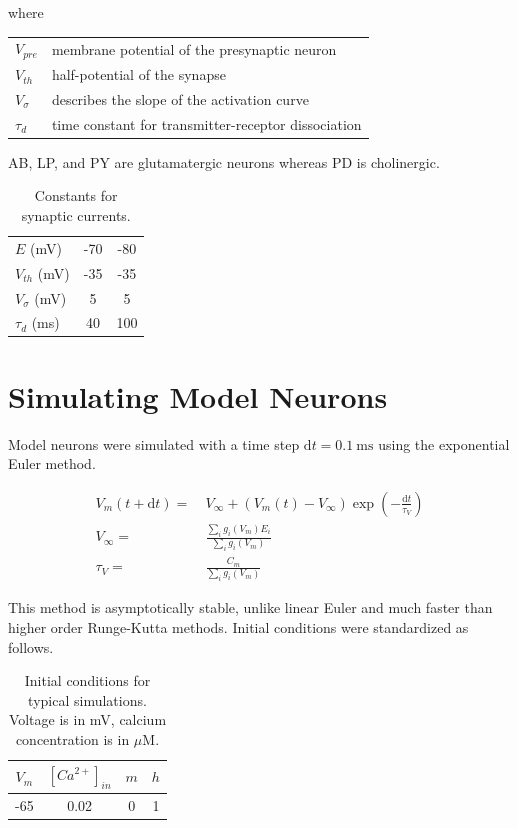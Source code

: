 where

\begin{tabular}{ll}
	$V_{pre}$	& membrane potential of the presynaptic neuron \\
	$V_{th}$ 	& half-potential of the synapse \\
	$V_\sigma$ 	& describes the slope of the activation curve \\
	$\tau_d$ 	& time constant for transmitter-receptor dissociation \\
\end{tabular}

\acs{AB}, \acs{LP}, and \acs{PY} are glutamatergic neurons whereas \acs{PD} is cholinergic.

\begin{table}[h]
	\myfloatalign
	\begin{tabularx}{\textwidth}{lcc} \toprule
		\tableheadline{Constant} & \tableheadline{Glutamatergic} & \tableheadline{Cholinergic} \\ \midrule
		$E$ (mV) & -70 & -80 \\
		$V_{th}$ (mV) & -35 & -35 \\
		$V_\sigma$ (mV) & 5 & 5 \\
		$\tau_d$ (ms) & 40 & 100 
	\end{tabularx}
	\caption[Constants for model synapses]{Constants for synaptic currents.}  
	\label{tab:synapses}
\end{table}

\section{Simulating Model Neurons} \label{sec:simulating}
Model neurons were simulated with a time step $\mathrm{d}t = 0.1~\mathrm{ms}$ using the exponential Euler method\autocite{DayanTheoreticalNeuroscience2001}. 

\begin{align} \label{eq:expeuler}
	V_m (t + \mathrm{d}t) =&\ V_\infty + (V_m (t) - V_\infty) \exp \left( -\frac{\mathrm{d}t}{\tau_V} \right) \\
	V_\infty =&\ \frac{ \sum_i g_i(V_m) E_i }{ \sum_i g_i(V_m) } \\
	\tau_V =&\ \frac{C_m}{ \sum_i g_i (V_m) }
\end{align}

This method is asymptotically stable, unlike linear Euler and much faster than higher order Runge-Kutta methods. Initial conditions were standardized as follows.

\begin{table}[h]
	\myfloatalign
	\begin{tabularx}{\textwidth}{cccc} \toprule
		$V_m$ & $\left[Ca^{2+}\right]_{in}$ & $m$ & $h$ \\ \midrule
		-65 & 0.02 & 0 & 1 \\
		\bottomrule
	\end{tabularx}
	\caption[Initial conditions]{Initial conditions for typical simulations. Voltage is in mV, calcium concentration is in $\mu$M.}  
	\label{tab:initialconditions}
\end{table}

